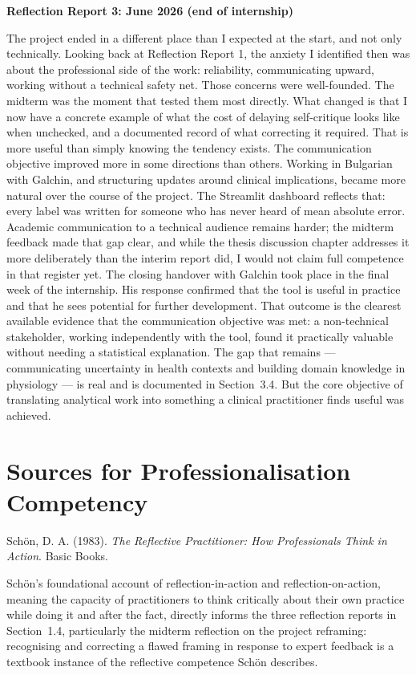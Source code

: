\documentclass[11pt,a4paper]{report}
\begin{document}
\textbf{Reflection Report 3: June 2026 (end of internship)}

The project ended in a different place than I expected at the start, and not
only technically. Looking back at Reflection Report 1, the anxiety I identified then was about the
professional side of the work: reliability, communicating upward, working without a technical
safety net. Those concerns were well-founded. The midterm was the moment that tested them most
directly. What changed is that I now have a concrete example of what the cost of delaying
self-critique looks like when unchecked, and a documented record of what correcting it required.
That is more useful than simply knowing the tendency exists. The communication objective improved
more in some directions than others. Working in Bulgarian with Galchin, and structuring updates
around clinical implications, became more natural over the course of the project. The Streamlit
dashboard reflects that: every label was written for someone who has never heard of mean absolute
error. Academic communication to a technical audience remains harder; the midterm feedback made
that gap clear, and while the thesis discussion chapter addresses it more deliberately than the
interim report did, I would not claim full competence in that register yet. The closing handover with Galchin took place in the final week of the internship. His response
confirmed that the tool is useful in practice and that he sees potential for further development.
That outcome is the clearest available evidence that the communication objective was met: a
non-technical stakeholder, working independently with the tool, found it practically valuable
without needing a statistical explanation. The gap that remains --- communicating uncertainty in
health contexts and building domain knowledge in physiology --- is real and is documented in
Section~3.4. But the core objective of translating analytical work into something a clinical
practitioner finds useful was achieved.

\section{Sources for Professionalisation Competency}

Schön, D. A. (1983). \textit{The Reflective Practitioner: How Professionals Think in Action}.
Basic Books.

Schön's foundational account of reflection-in-action and reflection-on-action, meaning the
capacity of practitioners to think critically about their own practice while doing it and after the
fact, directly informs the three reflection reports in Section~1.4, particularly the midterm
reflection on the project reframing: recognising and correcting a flawed framing in response to
expert feedback is a textbook instance of the reflective competence Schön describes.
\end{document}
